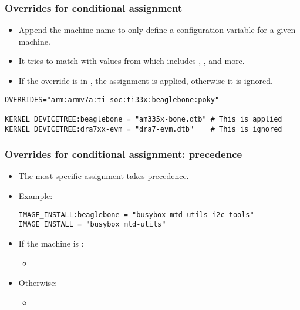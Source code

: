 \begin{frame}[fragile]
  \frametitle{Overrides for conditional assignment}
  \begin{itemize}
    \item Append the machine name to only define a configuration variable
      for a given machine.
    \item It tries to match with values from  which
      includes , , and more.
    \item If the override is in , the assignment is
      applied, otherwise it is ignored.
  \end{itemize}
  \begin{block}{}
    \begin{verbatim}
OVERRIDES="arm:armv7a:ti-soc:ti33x:beaglebone:poky"

KERNEL_DEVICETREE:beaglebone = "am335x-bone.dtb" # This is applied
KERNEL_DEVICETREE:dra7xx-evm = "dra7-evm.dtb"    # This is ignored
    \end{verbatim}
  \end{block}
\end{frame}

\begin{frame}[fragile]
  \frametitle{Overrides for conditional assignment: precedence}
  \begin{itemize}
    \item The most specific assignment takes precedence.
    \item Example:
      \begin{verbatim}
IMAGE_INSTALL:beaglebone = "busybox mtd-utils i2c-tools"
IMAGE_INSTALL = "busybox mtd-utils"
      \end{verbatim}
    \item If the machine is :
      \begin{itemize}
        \item {}
      \end{itemize}
    \item Otherwise:
      \begin{itemize}
        \item {}
      \end{itemize}
  \end{itemize}
\end{frame}

